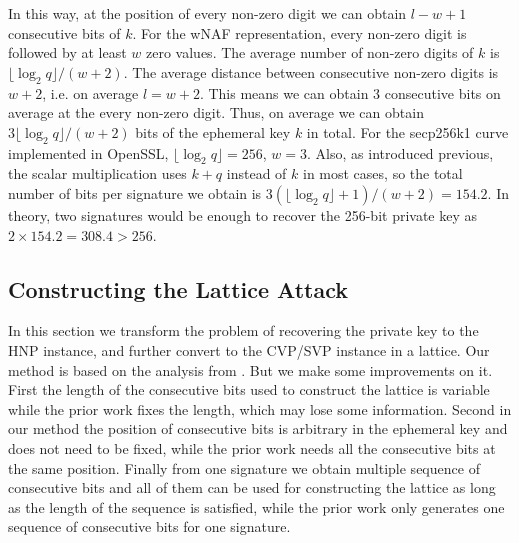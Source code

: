 In this way, at the position of every non-zero digit we can obtain $l - w + 1$ consecutive bits of $k$.
For the wNAF representation, every non-zero digit is followed by at least $w$ zero values.
 The average number of non-zero digits of $k$ is $\lfloor\log_{2}{q}\rfloor /(w+2)$.
 The average distance between consecutive non-zero digits is $w+2$, i.e. on average $l = w + 2$.
 This means we can obtain $3$ consecutive bits on average at the every non-zero digit.
Thus, on average we can obtain $3\lfloor\log_{2}{q}\rfloor /(w+2)$ bits of the ephemeral key $k$ in total.
For the secp256k1 curve implemented in OpenSSL, $\lfloor\log_{2}{q}\rfloor = 256$, $w = 3$.
 Also, as introduced previous, the scalar multiplication uses $k+q$ instead of $k$ in most cases,
  so the total number of bits per signature we obtain is $3(\lfloor\log_{2}{q}\rfloor +1)/(w+2) = 154.2$.
In theory, two signatures would be enough to recover the 256-bit private key as $2\times 154.2 = 308.4 > 256$.


%


\subsection{Constructing the Lattice Attack}
\label{data_proc2}
In this section we transform the problem of recovering the private key to the HNP instance, and further convert to the CVP/SVP instance in a lattice.
Our method is based on the analysis from \cite{Nguyen2002}.
But we make some improvements on it.
First the length of the consecutive bits used to construct the lattice is variable while the prior work fixes the length, which may lose some information.
Second  in our method the position of consecutive bits is arbitrary in the ephemeral key and does not need to be fixed, while the prior work needs all the consecutive bits at the same position.
Finally from one signature we obtain multiple sequence of consecutive bits and all of them can be used for constructing the lattice as long as the length of the sequence is satisfied, while the prior work only generates one sequence of consecutive bits for one signature.

